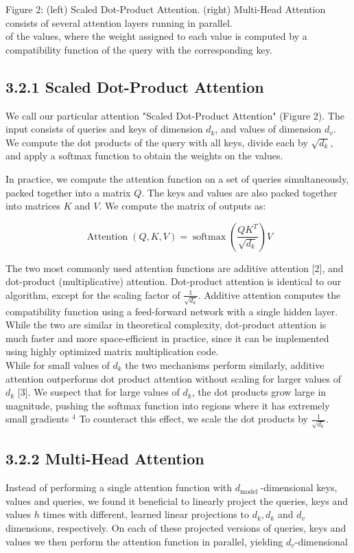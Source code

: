 \documentclass[10pt]{article}
\begin{document}
Figure 2: (left) Scaled Dot-Product Attention. (right) Multi-Head Attention consists of several attention layers running in parallel.\\
of the values, where the weight assigned to each value is computed by a compatibility function of the query with the corresponding key.

\subsection*{3.2.1 Scaled Dot-Product Attention}
We call our particular attention "Scaled Dot-Product Attention" (Figure 2). The input consists of queries and keys of dimension $d_{k}$, and values of dimension $d_{v}$. We compute the dot products of the query with all keys, divide each by $\sqrt{d_{k}}$, and apply a softmax function to obtain the weights on the values.

In practice, we compute the attention function on a set of queries simultaneously, packed together into a matrix $Q$. The keys and values are also packed together into matrices $K$ and $V$. We compute the matrix of outputs as:

\[
\operatorname{Attention}(Q, K, V)=\operatorname{softmax}\left(\frac{Q K^{T}}{\sqrt{d_{k}}}\right) V
\]

The two most commonly used attention functions are additive attention [2], and dot-product (multiplicative) attention. Dot-product attention is identical to our algorithm, except for the scaling factor of $\frac{1}{\sqrt{d_{k}}}$. Additive attention computes the compatibility function using a feed-forward network with a single hidden layer. While the two are similar in theoretical complexity, dot-product attention is much faster and more space-efficient in practice, since it can be implemented using highly optimized matrix multiplication code.\\
While for small values of $d_{k}$ the two mechanisms perform similarly, additive attention outperforms dot product attention without scaling for larger values of $d_{k}$ [3]. We suspect that for large values of $d_{k}$, the dot products grow large in magnitude, pushing the softmax function into regions where it has extremely small gradients ${ }^{4}$ To counteract this effect, we scale the dot products by $\frac{1}{\sqrt{d_{k}}}$.

\subsection*{3.2.2 Multi-Head Attention}
Instead of performing a single attention function with $d_{\text {model }}$-dimensional keys, values and queries, we found it beneficial to linearly project the queries, keys and values $h$ times with different, learned linear projections to $d_{k}, d_{k}$ and $d_{v}$ dimensions, respectively. On each of these projected versions of queries, keys and values we then perform the attention function in parallel, yielding $d_{v}$-dimensional
\end{document}

